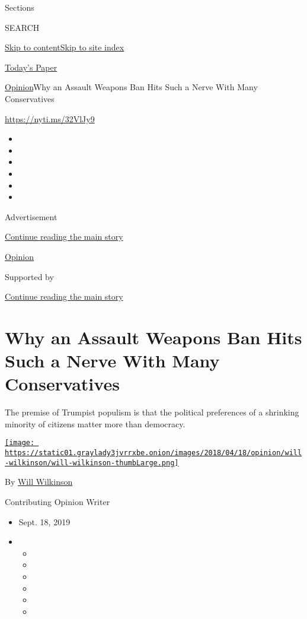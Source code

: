 Sections

SEARCH

\protect\hyperlink{site-content}{Skip to
content}\protect\hyperlink{site-index}{Skip to site index}

\href{https://myaccount.nytimes3xbfgragh.onion/auth/login?response_type=cookie\&client_id=vi}{}

\href{https://www.nytimes3xbfgragh.onion/section/todayspaper}{Today's
Paper}

\href{/section/opinion}{Opinion}\textbar{}Why an Assault Weapons Ban
Hits Such a Nerve With Many Conservatives

\url{https://nyti.ms/32VlJy9}

\begin{itemize}
\item
\item
\item
\item
\item
\item
\end{itemize}

Advertisement

\protect\hyperlink{after-top}{Continue reading the main story}

\href{/section/opinion}{Opinion}

Supported by

\protect\hyperlink{after-sponsor}{Continue reading the main story}

\hypertarget{why-an-assault-weapons-ban-hits-such-a-nerve-with-many-conservatives-}{%
\section{Why an Assault Weapons Ban Hits Such a Nerve With Many
Conservatives
}\label{why-an-assault-weapons-ban-hits-such-a-nerve-with-many-conservatives-}}

The premise of Trumpist populism is that the political preferences of a
shrinking minority of citizens matter more than democracy.

\href{https://www.nytimes3xbfgragh.onion/column/will-wilkinson}{\texttt{[image: https://static01.graylady3jvrrxbe.onion/images/2018/04/18/opinion/will-wilkinson/will-wilkinson-thumbLarge.png]}}

By \href{https://www.nytimes3xbfgragh.onion/column/will-wilkinson}{Will
Wilkinson}

Contributing Opinion Writer

\begin{itemize}
\item
  Sept. 18, 2019
\item
  \begin{itemize}
  \item
  \item
  \item
  \item
  \item
  \item
  \end{itemize}
\end{itemize}

